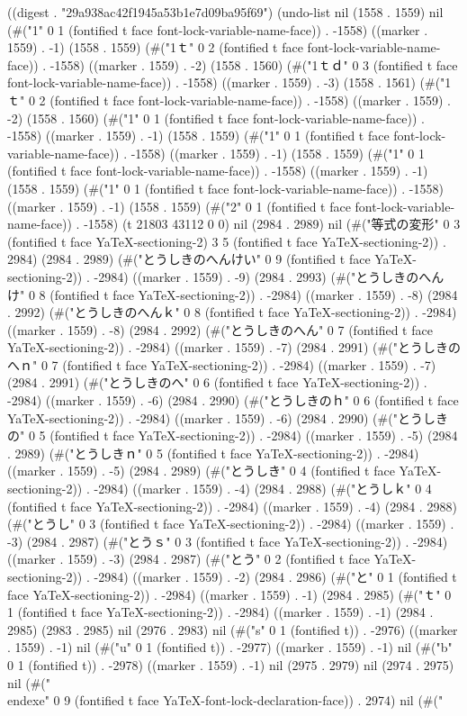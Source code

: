
((digest . "29a938ac42f1945a53b1e7d09ba95f69") (undo-list nil (1558 . 1559) nil (#("1" 0 1 (fontified t face font-lock-variable-name-face)) . -1558) ((marker . 1559) . -1) (1558 . 1559) (#("1ｔ" 0 2 (fontified t face font-lock-variable-name-face)) . -1558) ((marker . 1559) . -2) (1558 . 1560) (#("1ｔｄ" 0 3 (fontified t face font-lock-variable-name-face)) . -1558) ((marker . 1559) . -3) (1558 . 1561) (#("1ｔ" 0 2 (fontified t face font-lock-variable-name-face)) . -1558) ((marker . 1559) . -2) (1558 . 1560) (#("1" 0 1 (fontified t face font-lock-variable-name-face)) . -1558) ((marker . 1559) . -1) (1558 . 1559) (#("1" 0 1 (fontified t face font-lock-variable-name-face)) . -1558) ((marker . 1559) . -1) (1558 . 1559) (#("1" 0 1 (fontified t face font-lock-variable-name-face)) . -1558) ((marker . 1559) . -1) (1558 . 1559) (#("1" 0 1 (fontified t face font-lock-variable-name-face)) . -1558) ((marker . 1559) . -1) (1558 . 1559) (#("2" 0 1 (fontified t face font-lock-variable-name-face)) . -1558) (t 21803 43112 0 0) nil (2984 . 2989) nil (#("等式の変形" 0 3 (fontified t face YaTeX-sectioning-2) 3 5 (fontified t face YaTeX-sectioning-2)) . 2984) (2984 . 2989) (#("とうしきのへんけい" 0 9 (fontified t face YaTeX-sectioning-2)) . -2984) ((marker . 1559) . -9) (2984 . 2993) (#("とうしきのへんけ" 0 8 (fontified t face YaTeX-sectioning-2)) . -2984) ((marker . 1559) . -8) (2984 . 2992) (#("とうしきのへんｋ" 0 8 (fontified t face YaTeX-sectioning-2)) . -2984) ((marker . 1559) . -8) (2984 . 2992) (#("とうしきのへん" 0 7 (fontified t face YaTeX-sectioning-2)) . -2984) ((marker . 1559) . -7) (2984 . 2991) (#("とうしきのへｎ" 0 7 (fontified t face YaTeX-sectioning-2)) . -2984) ((marker . 1559) . -7) (2984 . 2991) (#("とうしきのへ" 0 6 (fontified t face YaTeX-sectioning-2)) . -2984) ((marker . 1559) . -6) (2984 . 2990) (#("とうしきのｈ" 0 6 (fontified t face YaTeX-sectioning-2)) . -2984) ((marker . 1559) . -6) (2984 . 2990) (#("とうしきの" 0 5 (fontified t face YaTeX-sectioning-2)) . -2984) ((marker . 1559) . -5) (2984 . 2989) (#("とうしきｎ" 0 5 (fontified t face YaTeX-sectioning-2)) . -2984) ((marker . 1559) . -5) (2984 . 2989) (#("とうしき" 0 4 (fontified t face YaTeX-sectioning-2)) . -2984) ((marker . 1559) . -4) (2984 . 2988) (#("とうしｋ" 0 4 (fontified t face YaTeX-sectioning-2)) . -2984) ((marker . 1559) . -4) (2984 . 2988) (#("とうし" 0 3 (fontified t face YaTeX-sectioning-2)) . -2984) ((marker . 1559) . -3) (2984 . 2987) (#("とうｓ" 0 3 (fontified t face YaTeX-sectioning-2)) . -2984) ((marker . 1559) . -3) (2984 . 2987) (#("とう" 0 2 (fontified t face YaTeX-sectioning-2)) . -2984) ((marker . 1559) . -2) (2984 . 2986) (#("と" 0 1 (fontified t face YaTeX-sectioning-2)) . -2984) ((marker . 1559) . -1) (2984 . 2985) (#("ｔ" 0 1 (fontified t face YaTeX-sectioning-2)) . -2984) ((marker . 1559) . -1) (2984 . 2985) (2983 . 2985) nil (2976 . 2983) nil (#("s" 0 1 (fontified t)) . -2976) ((marker . 1559) . -1) nil (#("u" 0 1 (fontified t)) . -2977) ((marker . 1559) . -1) nil (#("b" 0 1 (fontified t)) . -2978) ((marker . 1559) . -1) nil (2975 . 2979) nil (2974 . 2975) nil (#("\\end{exe}" 0 9 (fontified t face YaTeX-font-lock-declaration-face)) . 2974) nil (#("
